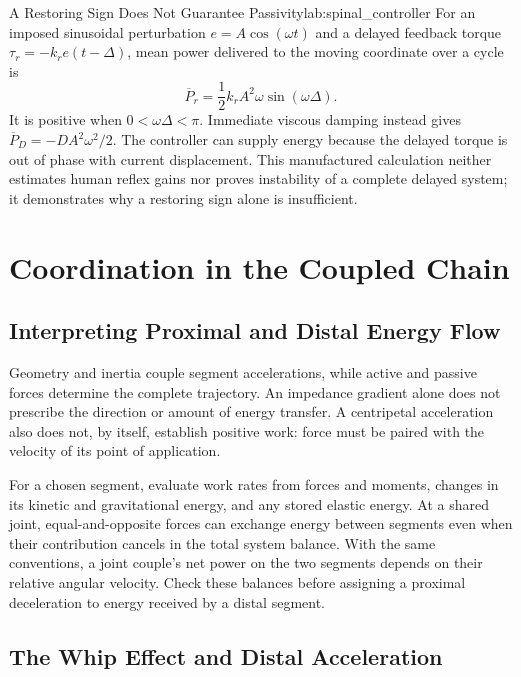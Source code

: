 \begin{example}{A Restoring Sign Does Not Guarantee Passivity}{lab:spinal_controller}
For an imposed sinusoidal perturbation $e=A\cos(\omega t)$ and a delayed feedback torque $\tau_r=-k_r e(t-\Delta)$, mean power delivered to the moving coordinate over a cycle is
\[
\overline P_r=\frac12 k_r A^2\omega\sin(\omega\Delta).
\]
It is positive when $0<\omega\Delta<\pi$. Immediate viscous damping instead gives $\overline P_D=-DA^2\omega^2/2$. The controller can supply energy because the delayed torque is out of phase with current displacement. This manufactured calculation neither estimates human reflex gains nor proves instability of a complete delayed system; it demonstrates why a restoring sign alone is insufficient.
\end{example}

\section{Coordination in the Coupled Chain}
\label{sec:self_organization}

\subsection{Interpreting Proximal and Distal Energy Flow}
\label{subsec:energy_flow}

Geometry and inertia couple segment accelerations, while active and passive forces determine the complete trajectory. An impedance gradient alone does not prescribe the direction or amount of energy transfer. A centripetal acceleration also does not, by itself, establish positive work: force must be paired with the velocity of its point of application.

For a chosen segment, evaluate work rates from forces and moments, changes in its kinetic and gravitational energy, and any stored elastic energy. At a shared joint, equal-and-opposite forces can exchange energy between segments even when their contribution cancels in the total system balance. With the same conventions, a joint couple's net power on the two segments depends on their relative angular velocity. Check these balances before assigning a proximal deceleration to energy received by a distal segment.

\subsection{The Whip Effect and Distal Acceleration}
\label{subsec:whip_effect}

